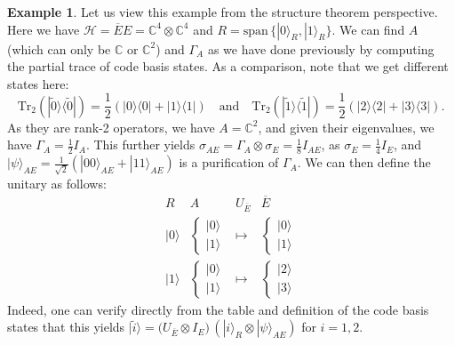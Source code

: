 \documentclass[11pt]{amsart}
\theoremstyle{definition}
\newtheorem{example}[thm]{Example}
\theoremstyle{definition}
\theoremstyle{definition}
\newcommand{\tr}{\textrm{Tr}}
\newcommand{\1}{\mathbb{I}}
\def\ket#1{| #1 \rangle}
\def\kb#1#2{|#1\rangle\!\langle #2 |}
\begin{document}
\begin{example}
Let us view this example from the structure theorem perspective. Here we have $\mathcal H = \overline{E} E = \mathbb{C}^4 \otimes \mathbb{C}^4$ and $R = \mathrm{span}\, \{ \ket{0}_R, \ket{1}_R \}$. We can find $A$ (which can only be $\mathbb{C}$ or $\mathbb{C}^2$) and $\Gamma_A$ as we have done previously by computing the partial trace of code basis states. As a comparison, note that we get different states here: 
\[
\tr_2 ( \kb{\widetilde{0}}{\widetilde{0}} ) = \frac12 (\kb{0}{0} + \kb{1}{1}    )  \quad \mathrm{and} \quad 
  \tr_2 ( \kb{\widetilde{1}}{\widetilde{1}} ) = \frac12 (\kb{2}{2} + \kb{3}{3}    )  .  
\]
As they are rank-2 operators, we have $A=\mathbb{C}^2$, and given their eigenvalues, we have $\Gamma_A = \frac12 I_A$. This further yields $ \sigma_{AE} = \Gamma_A \otimes \sigma_E = \frac18 I_{AE}$, as $\sigma_E = \frac14 I_E$, and $\ket{\psi}_{AE} = \frac{1}{\sqrt{2}} (\ket{00}_{AE}  + \ket{11}_{AE})$ is a purification of $\Gamma_A$. 
We can then define the unitary as follows: 
\[
\begin{array}{cccc} 
R & A & U_{\overline{E}}  & \overline{E}  \\ \hline 
\ket{0} & \left\{ \begin{array}{l}  \ket{0} \\ \ket{1} \end{array} \right. & \longmapsto & \left\{ \begin{array}{l}  
\ket{0} \\ 
\ket{1} \end{array} \right. \\ 
\ket{1} & \left\{ \begin{array}{l}  \ket{0} \\ \ket{1} \end{array} \right. & \longmapsto & \left\{ \begin{array}{l}   
\ket{2} \\ 
\ket{3} 
\end{array} \right. 
\end{array} 
\] 
Indeed, one can verify directly from the table and definition of the code basis states that this yields $\ket{\widetilde{i}} = \big( U_{\overline{E}} \otimes I_E \big) \, ( \ket{i}_R \otimes \ket{\psi}_{A E})$ for $i=1,2$. 


\end{example}
\end{document}
